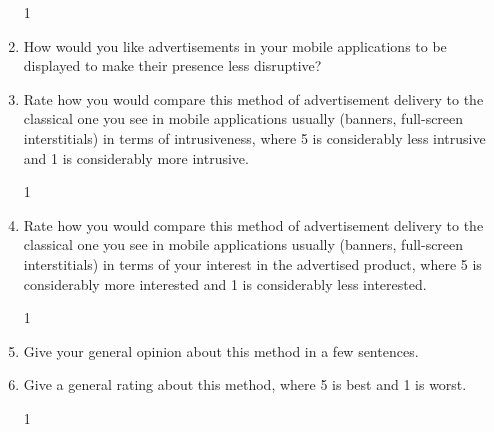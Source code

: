 \begin{enumerate}
1	\tab{}	\tab{}	\tab\tab	4	\tab\tab	5  
  
  \item How would you like advertisements in your mobile applications to be displayed to make their presence less disruptive?
  
\noindent\makebox[\linewidth]{\rule{\textwidth}{0.4pt}}
\noindent\makebox[\linewidth]{\rule{\textwidth}{0.4pt}}
\noindent\makebox[\linewidth]{\rule{\textwidth}{0.4pt}}
  
  \item Rate how you would compare this method of advertisement delivery to the classical one you see in mobile applications usually (banners, full-screen interstitials) in terms of intrusiveness, where 5 is considerably less intrusive and 1 is considerably more intrusive.
  
1	\tab{}	\tab{}	\tab{}	\tab{}  
  
  \item Rate how you would compare this method of advertisement delivery to the classical one you see in mobile applications usually (banners, full-screen interstitials) in terms of your interest in the advertised product, where 5 is considerably more interested and 1 is considerably less interested.
  
1	\tab{}	\tab{}	\tab{}	\tab{}  
  
  \item Give your general opinion about this method in a few sentences.
  
\noindent\makebox[\linewidth]{\rule{\textwidth}{0.4pt}}
\noindent\makebox[\linewidth]{\rule{\textwidth}{0.4pt}}
\noindent\makebox[\linewidth]{\rule{\textwidth}{0.4pt}}
  
  \item Give a general rating about this method, where 5 is best and 1 is worst.
  
1	\tab{}	\tab{}	\tab{}	\tab{}  
  
\end{enumerate}

